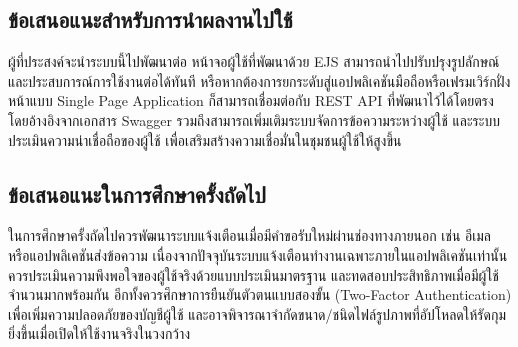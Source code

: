 \documentclass[12pt,a4paper]{report}
\begin{document}
\subsection{ข้อเสนอแนะสำหรับการนำผลงานไปใช้}

ผู้ที่ประสงค์จะนำระบบนี้ไปพัฒนาต่อ หน้าจอผู้ใช้ที่พัฒนาด้วย EJS สามารถนำไปปรับปรุงรูปลักษณ์และประสบการณ์การใช้งานต่อได้ทันที หรือหากต้องการยกระดับสู่แอปพลิเคชันมือถือหรือเฟรมเวิร์กฝั่งหน้าแบบ Single Page Application ก็สามารถเชื่อมต่อกับ REST API ที่พัฒนาไว้ได้โดยตรงโดยอ้างอิงจากเอกสาร Swagger รวมถึงสามารถเพิ่มเติมระบบจัดการข้อความระหว่างผู้ใช้ และระบบประเมินความน่าเชื่อถือของผู้ใช้ เพื่อเสริมสร้างความเชื่อมั่นในชุมชนผู้ใช้ให้สูงขึ้น

\subsection{ข้อเสนอแนะในการศึกษาครั้งถัดไป}

ในการศึกษาครั้งถัดไปควรพัฒนาระบบแจ้งเตือนเมื่อมีคำขอรับใหม่ผ่านช่องทางภายนอก เช่น อีเมลหรือแอปพลิเคชันส่งข้อความ เนื่องจากปัจจุบันระบบแจ้งเตือนทำงานเฉพาะภายในแอปพลิเคชันเท่านั้น ควรประเมินความพึงพอใจของผู้ใช้จริงด้วยแบบประเมินมาตรฐาน และทดสอบประสิทธิภาพเมื่อมีผู้ใช้จำนวนมากพร้อมกัน อีกทั้งควรศึกษาการยืนยันตัวตนแบบสองขั้น (Two-Factor Authentication) เพื่อเพิ่มความปลอดภัยของบัญชีผู้ใช้ และอาจพิจารณาจำกัดขนาด/ชนิดไฟล์รูปภาพที่อัปโหลดให้รัดกุมยิ่งขึ้นเมื่อเปิดให้ใช้งานจริงในวงกว้าง
\end{document}
